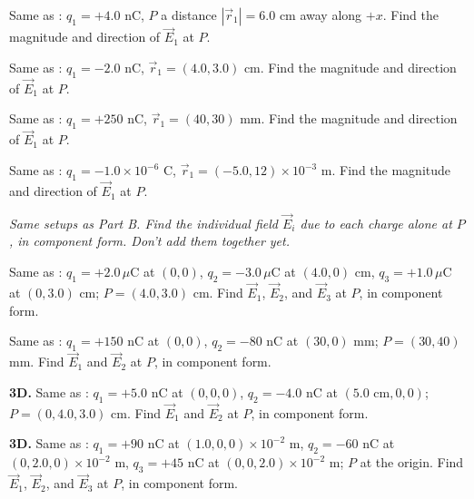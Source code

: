 \documentclass[12pt]{article}
\begin{document}
\prob Same as : $q_1=+4.0$ nC, $P$ a distance $|\vec{r}_1|=6.0$ cm away along $+x$. Find the magnitude and direction of $\vec{E}_1$ at $P$.


\prob Same as : $q_1=-2.0$ nC, $\vec{r}_1=(4.0,3.0)$ cm. Find the magnitude and direction of $\vec{E}_1$ at $P$.


\prob Same as : $q_1=+250$ nC, $\vec{r}_1=(40,30)$ mm. Find the magnitude and direction of $\vec{E}_1$ at $P$.


\prob Same as : $q_1=-1.0\times10^{-6}$ C, $\vec{r}_1=(-5.0,12)\times10^{-3}$ m. Find the magnitude and direction of $\vec{E}_1$ at $P$.


\clearpage

\textit{Same setups as Part B. Find the individual field $\vec{E}_i$ due to each charge alone at $P$, in component form. Don't add them together yet.}

\prob Same as : $q_1=+2.0\,\mu\text{C}$ at $(0,0)$, $q_2=-3.0\,\mu\text{C}$ at $(4.0,0)$ cm, $q_3=+1.0\,\mu\text{C}$ at $(0,3.0)$ cm; $P=(4.0,3.0)$ cm. Find $\vec{E}_1$, $\vec{E}_2$, and $\vec{E}_3$ at $P$, in component form.


\prob Same as : $q_1=+150$ nC at $(0,0)$, $q_2=-80$ nC at $(30,0)$ mm; $P=(30,40)$ mm. Find $\vec{E}_1$ and $\vec{E}_2$ at $P$, in component form.


\clearpage

\prob \textbf{3D.} Same as : $q_1=+5.0$ nC at $(0,0,0)$, $q_2=-4.0$ nC at $(5.0\text{ cm},0,0)$; $P=(0,4.0,3.0)$ cm. Find $\vec{E}_1$ and $\vec{E}_2$ at $P$, in component form.


\prob \textbf{3D.} Same as : $q_1=+90$ nC at $(1.0,0,0)\times10^{-2}$ m, $q_2=-60$ nC at $(0,2.0,0)\times10^{-2}$ m, $q_3=+45$ nC at $(0,0,2.0)\times10^{-2}$ m; $P$ at the origin. Find $\vec{E}_1$, $\vec{E}_2$, and $\vec{E}_3$ at $P$, in component form.


\clearpage
\end{document}

